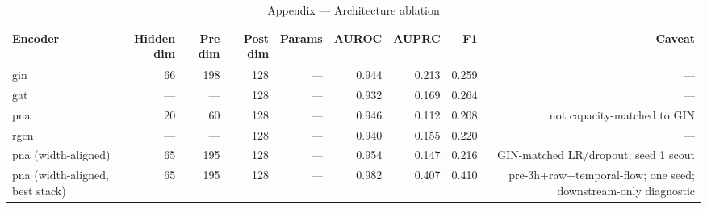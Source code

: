 \begin{table}[t]
\centering
\caption{Appendix — Architecture ablation}
\begin{tabular}{lrrrrrrrr}
\toprule
Encoder & Hidden dim & Pre dim & Post dim & Params & AUROC & AUPRC & F1 & Caveat \\
\midrule
gin & 66 & 198 & 128 & --- & 0.944 & 0.213 & 0.259 & --- \\
gat & --- & --- & 128 & --- & 0.932 & 0.169 & 0.264 & --- \\
pna & 20 & 60 & 128 & --- & 0.946 & 0.112 & 0.208 & not capacity-matched to GIN \\
rgcn & --- & --- & 128 & --- & 0.940 & 0.155 & 0.220 & --- \\
pna (width-aligned) & 65 & 195 & 128 & --- & 0.954 & 0.147 & 0.216 & GIN-matched LR/dropout; seed 1 scout \\
pna (width-aligned, best stack) & 65 & 195 & 128 & --- & 0.982 & 0.407 & 0.410 & pre-3h+raw+temporal-flow; one seed; downstream-only diagnostic \\
\bottomrule
\end{tabular}
\end{table}
